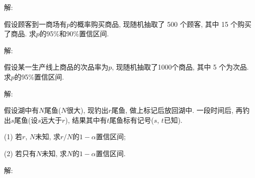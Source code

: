 \documentclass[standard]{ExBook}
\begin{document}
\begin{qitems}
\vspace{-5em}

    \begin{bbox}
解: 
    \end{bbox}

\vspace{-5em}

    \begin{bbox}
    \begin{shaded}
        \qitem
假设顾客到一商场有$p$的概率购买商品, 现随机抽取了 500 个顾客, 其中 15 个购买了商品. 求$p$的95\%和90\%置信区间.
    \end{shaded}
    \end{bbox}

\vspace{-5em}

    \begin{bbox}
解: 
    \end{bbox}

\vspace{-5em}

    \begin{bbox}
    \begin{shaded}
        \qitem
假设某一生产线上商品的次品率为$p$, 现随机抽取了1000个商品, 其中 5 个为次品. 求$p$的95\%置信区间.
    \end{shaded}
    \end{bbox}

\vspace{-5em}

    \begin{bbox}
解: 
    \end{bbox}

\vspace{-5em}

    \begin{bbox}
    \begin{shaded}
        \qitem
假设湖中有$N$尾鱼($N$很大), 现钓出$r$尾鱼, 做上标记后放回湖中. 一段时间后, 再钓出$s$尾鱼(设$s$远大于$r$), 结果其中有$t$尾鱼标有记号($s$, $t$已知).

(1) 若$r$, $N$未知, 求$r/N$的$1-\alpha$置信区间;

(2) 若只有$N$未知, 求$N$的$1 - \alpha$置信区间.
    \end{shaded}
    \end{bbox}

\vspace{-5em}

    \begin{bbox}
解: 
    \end{bbox}


\end{qitems}
\end{document}
